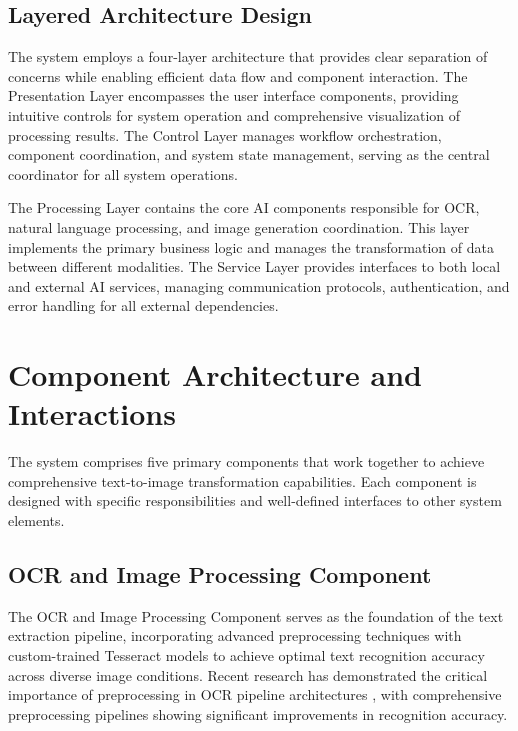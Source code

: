\subsection{Layered Architecture Design}

The system employs a four-layer architecture that provides clear separation of concerns while enabling efficient data flow and component interaction. The Presentation Layer encompasses the user interface components, providing intuitive controls for system operation and comprehensive visualization of processing results. The Control Layer manages workflow orchestration, component coordination, and system state management, serving as the central coordinator for all system operations.

The Processing Layer contains the core AI components responsible for OCR, natural language processing, and image generation coordination. This layer implements the primary business logic and manages the transformation of data between different modalities. The Service Layer provides interfaces to both local and external AI services, managing communication protocols, authentication, and error handling for all external dependencies.

\section{Component Architecture and Interactions}

The system comprises five primary components that work together to achieve comprehensive text-to-image transformation capabilities. Each component is designed with specific responsibilities and well-defined interfaces to other system elements.

\subsection{OCR and Image Processing Component}

The OCR and Image Processing Component serves as the foundation of the text extraction pipeline, incorporating advanced preprocessing techniques with custom-trained Tesseract models to achieve optimal text recognition accuracy across diverse image conditions. Recent research has demonstrated the critical importance of preprocessing in OCR pipeline architectures \cite{wang2025prep, ye2024general}, with comprehensive preprocessing pipelines showing significant improvements in recognition accuracy.

